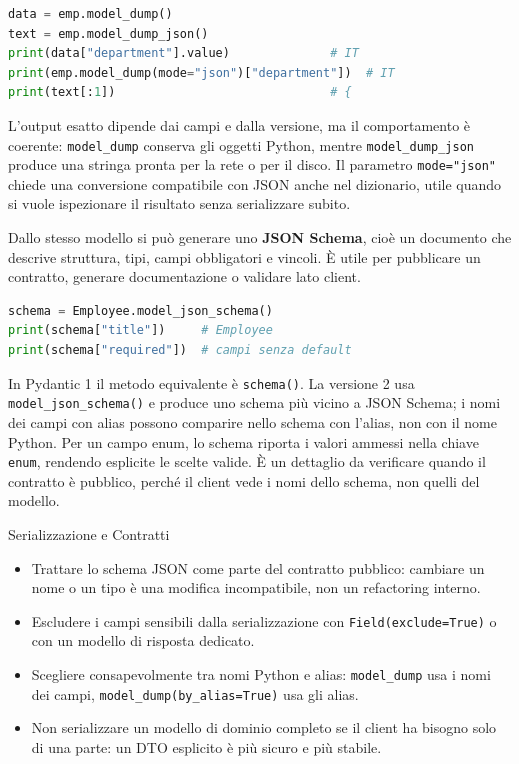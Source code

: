 \documentclass[12pt]{extarticle}
\begin{document}
\begin{lstlisting}[language=Python]
data = emp.model_dump()
text = emp.model_dump_json()
print(data["department"].value)              # IT
print(emp.model_dump(mode="json")["department"])  # IT
print(text[:1])                              # {
\end{lstlisting}

\noindent L'output esatto dipende dai campi e dalla versione, ma il comportamento è coerente: \texttt{model\_dump} conserva gli oggetti Python, mentre \texttt{model\_dump\_json} produce una stringa pronta per la rete o per il disco. Il parametro \texttt{mode="json"} chiede una conversione compatibile con JSON anche nel dizionario, utile quando si vuole ispezionare il risultato senza serializzare subito.

\noindent Dallo stesso modello si può generare uno \textbf{JSON Schema}, cioè un documento che descrive struttura, tipi, campi obbligatori e vincoli. È utile per pubblicare un contratto, generare documentazione o validare lato client.

\begin{lstlisting}[language=Python]
schema = Employee.model_json_schema()
print(schema["title"])     # Employee
print(schema["required"])  # campi senza default
\end{lstlisting}

\noindent In Pydantic 1 il metodo equivalente è \texttt{schema()}. La versione 2 usa \texttt{model\_json\_schema()} e produce uno schema più vicino a JSON Schema; i nomi dei campi con alias possono comparire nello schema con l'alias, non con il nome Python. Per un campo enum, lo schema riporta i valori ammessi nella chiave \texttt{enum}, rendendo esplicite le scelte valide. È un dettaglio da verificare quando il contratto è pubblico, perché il client vede i nomi dello schema, non quelli del modello.

\begin{cbox}{Serializzazione e Contratti}
\begin{itemize}
    \item Trattare lo schema JSON come parte del contratto pubblico: cambiare un nome o un tipo è una modifica incompatibile, non un refactoring interno.
    \item Escludere i campi sensibili dalla serializzazione con \texttt{Field(exclude=True)} o con un modello di risposta dedicato.
    \item Scegliere consapevolmente tra nomi Python e alias: \texttt{model\_dump} usa i nomi dei campi, \texttt{model\_dump(by\_alias=True)} usa gli alias.
    \item Non serializzare un modello di dominio completo se il client ha bisogno solo di una parte: un DTO esplicito è più sicuro e più stabile.
\end{itemize}
\end{cbox}
\end{document}
